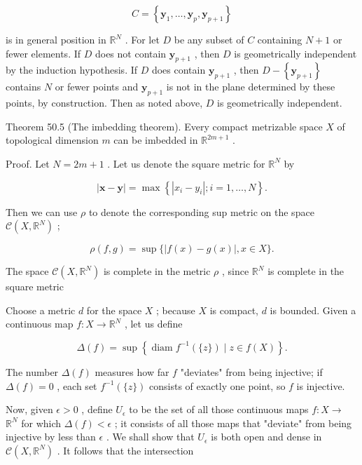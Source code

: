 \[
C = \left\{  {{\mathbf{y}}_{1},\ldots ,{\mathbf{y}}_{p},{\mathbf{y}}_{p + 1}}\right\}
\]

is in general position in \({\mathbb{R}}^{N}\) . For let \(D\) be any subset of \(C\) containing \(N + 1\) or fewer elements. If \(D\) does not contain \({\mathbf{y}}_{p + 1}\) , then \(D\) is geometrically independent by the induction hypothesis. If \(D\) does contain \({\mathbf{y}}_{p + 1}\) , then \(D - \left\{  {\mathbf{y}}_{p + 1}\right\}\) contains \(N\) or fewer points and \({\mathbf{y}}_{p + 1}\) is not in the plane determined by these points, by construction. Then as noted above, \(D\) is geometrically independent.

Theorem 50.5 (The imbedding theorem). Every compact metrizable space \(X\) of topological dimension \(m\) can be imbedded in \({\mathbb{R}}^{{2m} + 1}\) .

Proof. Let \(N = {2m} + 1\) . Let us denote the square metric for \({\mathbb{R}}^{N}\) by

\[
\left| {\mathbf{x} - \mathbf{y}}\right|  = \max \left\{  {\left| {{x}_{i} - {y}_{i}}\right| ;i = 1,\ldots ,N}\right\}  .
\]

Then we can use \(\rho\) to denote the corresponding sup metric on the space \(\mathcal{C}\left( {X,{\mathbb{R}}^{N}}\right)\) ;

\[
\rho \left( {f,g}\right)  = \sup \{ \left| {f\left( x\right)  - g\left( x\right) }\right| ,x \in  X\} .
\]

The space \(\mathcal{C}\left( {X,{\mathbb{R}}^{N}}\right)\) is complete in the metric \(\rho\) , since \({\mathbb{R}}^{N}\) is complete in the square metric

Choose a metric \(d\) for the space \(X\) ; because \(X\) is compact, \(d\) is bounded. Given a continuous map \(f : X \rightarrow  {\mathbb{R}}^{N}\) , let us define

\[
\Delta \left( f\right)  = \sup \left\{  {\operatorname{diam}{f}^{-1}\left( {\{ z\} }\right)  \mid  z \in  f\left( X\right) }\right\}  .
\]

The number \(\Delta \left( f\right)\) measures how far \(f\) "deviates" from being injective; if \(\Delta \left( f\right)  = 0\) , each set \({f}^{-1}\left( {\{ z\} }\right)\) consists of exactly one point, so \(f\) is injective.

Now, given \(\epsilon  > 0\) , define \({U}_{\epsilon }\) to be the set of all those continuous maps \(f : X \rightarrow\)  \({\mathbb{R}}^{N}\) for which \(\Delta \left( f\right)  < \epsilon\) ; it consists of all those maps that "deviate" from being injective by less than \(\epsilon\) . We shall show that \({U}_{\epsilon }\) is both open and dense in \(\mathcal{C}\left( {X,{\mathbb{R}}^{N}}\right)\) . It follows that the intersection

